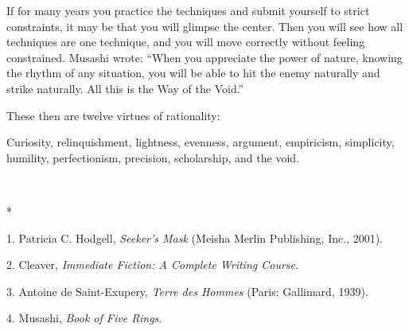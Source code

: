 {
 If for many years you practice the techniques and submit yourself
to strict constraints, it may be that you will glimpse the center. Then
you will see how all techniques are one technique, and you will move
correctly without feeling constrained. Musashi wrote:
``When you appreciate the power of nature, knowing the
rhythm of any situation, you will be able to hit the enemy naturally
and strike naturally. All this is the Way of the
Void.''}

{
 These then are twelve virtues of rationality:}

{
 Curiosity, relinquishment, lightness, evenness, argument,
empiricism, simplicity, humility, perfectionism, precision,
scholarship, and the void.}

{\centering
 \ ~
\par}

{\centering
 *
\par}


\bigskip

{
 1. Patricia C. Hodgell, \textit{Seeker's Mask}
(Meisha Merlin Publishing, Inc., 2001).}

{
 2. Cleaver, \textit{Immediate Fiction: A Complete Writing
Course}.}

{
 3. Antoine de Saint-Exupery, \textit{Terre des Hommes} (Paris:
Gallimard, 1939).}

{
 4. Musashi, \textit{Book of Five Rings}.}


